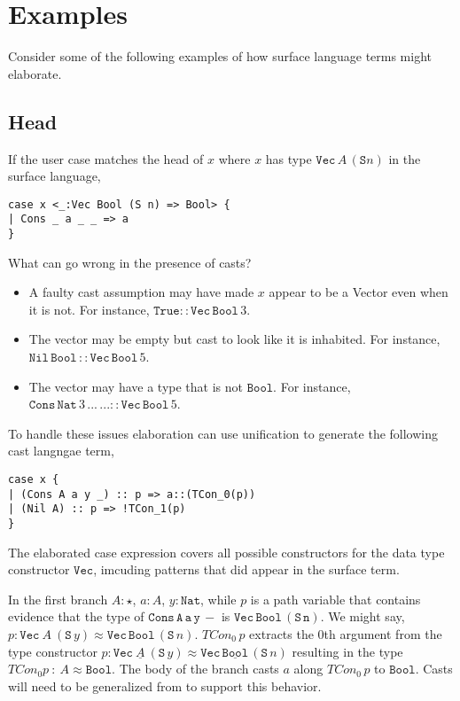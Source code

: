 \section{Examples}
 
Consider some of the following examples of how surface language terms might elaborate.
 
\subsection{Head}
 
If the user case matches the head of $x$ where $x$ has type $\mathtt{Vec}\,A\,(\mathtt{S}n)$ in the surface language,
 
\begin{lstlisting}[basicstyle={\ttfamily\small}]
case x <_:Vec Bool (S n) => Bool> {
| Cons _ a _ _ => a
}
\end{lstlisting}
 
What can go wrong in the presence of casts?
\begin{itemize}
\item
A faulty cast assumption may have made $x$ appear to be a Vector even when it is not.
For instance, $\mathtt{True}::\mathtt{Vec}\,\mathtt{Bool}\,3$.
\item
The vector may be empty but cast to look like it is inhabited.
For instance, $\mathtt{Nil}\,\mathtt{Bool}\,::\mathtt{Vec}\,\mathtt{Bool}\,5$.
\item
The vector may have a type that is not $\mathtt{Bool}$.
For instance, $\mathtt{Cons}\,\mathtt{Nat}\,3\,...\,...::\mathtt{Vec}\,\mathtt{Bool}\,5$.
\end{itemize}
 
To handle these issues elaboration can use unification to generate the following cast langngae term,
 
\begin{lstlisting}[basicstyle={\ttfamily\small}]
case x {
| (Cons A a y _) :: p => a::(TCon_0(p))
| (Nil A) :: p => !TCon_1(p)
}
\end{lstlisting}
 
The elaborated case expression covers all possible constructors for the data type constructor $\mathtt{Vec}$, imcuding patterns that did appear in the surface term.
 
In the first branch $A:\star$, $a:A$, $y:\mathtt{Nat}$, while $p$ is a path variable that contains evidence that the type of $\mathtt{Cons\,A\,a\,y\,-}$ is $\mathtt{Vec\,Bool\,(S\,n)}$.
We might say, $p:\mathtt{Vec}\ A\ (\mathtt{S}\,y)\approx\mathtt{Vec}\,\mathtt{Bool}\,(\mathtt{S}\,n)$.
$TCon_{0}\,p$ extracts the 0th argument from the type constructor $p:\mathtt{Vec}\ \underline{A}\ (\mathtt{S}\,y)\approx\mathtt{Vec}\,\underline{\mathtt{Bool}}\,(\mathtt{S}\,n)$ resulting in the type $TCon_{0}p\ :\ A\approx\mathtt{Bool}$.
The body of the branch casts $a$ along $TCon_{0}\,p$ to $\mathtt{Bool}$.
Casts will need to be generalized from  to support this behavior.
 
